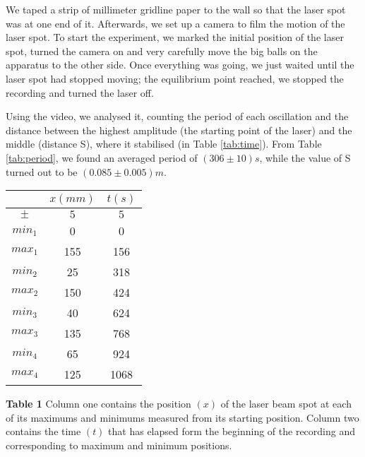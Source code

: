 \documentclass[12pt]{article}
\begin{document}
We taped a strip of millimeter gridline paper to the wall so that the laser spot was at one end of it. Afterwards, we set up a camera to film the motion of the laser spot. To start the experiment, we marked the initial position of the laser spot, turned the camera on and very carefully move the big balls on the apparatus to the other side. Once everything was going, we just waited until the laser spot had stopped moving; the equilibrium point reached, we stopped the recording and turned the laser off.

Using the video, we analysed it, counting the period of each oscillation and the distance between the highest amplitude (the starting point of the laser) and the middle (distance S), where it stabilised (in Table \ref{tab:time}). From Table \ref{tab:period}, we found an averaged period of $(306 \pm 10) s$, while the value of S turned out to be $(0.085 \pm 0.005) m$.

\begin{center}
    \begin{threeparttable}\label{tab:time}
        \begin{tabular}{| c | c | c |}
            \hline
                & $x (mm)$ & $t (s)$\\ \hline
        $\pm$   & $5$ & $5$ \\ \hline 
        $min_1$ & 0   & 0    \\ \hline 
        $max_1$ & 155 & 156  \\ \hline 
        $min_2$ & 25  & 318  \\ \hline 
        $max_2$ & 150 & 424  \\ \hline 
        $min_3$ & 40  & 624  \\ \hline 
        $max_3$ & 135 & 768  \\ \hline 
        $min_4$ & 65  & 924  \\ \hline 
        $max_4$ & 125 & 1068 \\ \hline 
    \end{tabular}

    \begin{tablenotes}
    \end{tablenotes}
\item \footnotesize \textbf{Table 1} Column one contains the position $(x)$ of the laser beam spot at each of its maximums and minimums measured from its starting position. Column two contains the time $(t)$ that has elapsed form the beginning of the recording and corresponding to maximum and minimum positions. 
\end{threeparttable}
\end{center}
\end{document}
